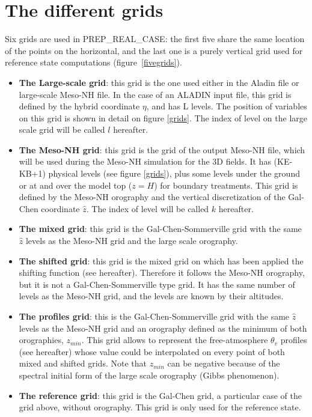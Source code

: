 \section{The different grids}
Six grids are used in PREP\_REAL\_CASE: the first five share the same
location of the points on the horizontal, and the last one is a purely
vertical grid used for reference state computations
(figure~\ref{fivegrids}).
\begin{itemize}
\item
{\bf{The Large-scale grid}}: this grid is the one used either in the Aladin file
or large-scale Meso-NH file. In the case of an ALADIN input file, this grid is
defined by the hybrid coordinate $\eta$, and has L levels. The position of
variables on this grid is shown in detail on figure \ref{grids}. The
index of level on the large scale grid will be called $l$ hereafter.
\item
{\bf{The Meso-NH grid}}: this grid is the grid of the output Meso-NH file, which will be
used during the Meso-NH simulation for the 3D fields. It has (KE-KB+1)
physical levels (see figure \ref{grids}), plus some levels under the ground or
at and over the model top ($z=H$) for boundary treatments.
This grid is defined by the Meso-NH orography and the vertical discretization
of the Gal-Chen coordinate $\widehat{z}$. The index of level will be called
$k$ hereafter.
\item
{\bf{The mixed grid}}: this grid is the Gal-Chen-Sommerville grid with
the same $\widehat{z}$ levels as the Meso-NH grid and the large scale
orography.
\item
{\bf{The shifted grid}}: this grid is the mixed grid on which has been applied
the shifting function (see hereafter). Therefore it follows the Meso-NH
orography, but it is not a Gal-Chen-Sommerville type grid.
It has the same number of levels as the Meso-NH grid, and the
levels are known by their altitudes.
\item
{\bf{The profiles grid}}: this is the Gal-Chen-Sommerville grid with
the same $\widehat{z}$ levels as the Meso-NH grid and an orography defined
as the minimum of both orographies, $z_{min}$.
This grid allows to represent the free-atmosphere $\theta_v$ profiles
(see hereafter) whose value could be interpolated
on every point of both mixed and shifted grids. Note that $z_{min}$ can be
negative because of the spectral initial form of the large scale orography
(Gibbs phenomenon).
\item
{\bf{The reference grid}}: this grid is the Gal-Chen grid, a particular case of the
grid above, without orography. This grid is only used for the reference state.
\end{itemize}

